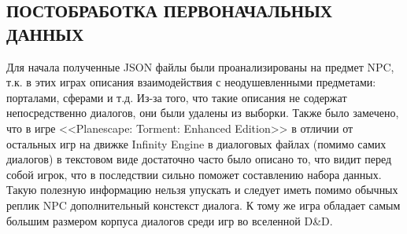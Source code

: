 \subsection{ПОСТОБРАБОТКА ПЕРВОНАЧАЛЬНЫХ ДАННЫХ}

Для начала полученные JSON файлы были проанализированы на предмет NPC, т.к. в этих играх описания взаимодействия с неодушевленными предметами: порталами, сферами и т.д. Из-за того, что такие описания не содержат непосредственно диалогов, они были удалены из выборки. Также было замечено, что в игре <<Planescape: Torment: Enhanced Edition>> в отличии от остальных игр на движке Infinity Engine в диалоговых файлах (помимо самих диалогов) в текстовом виде достаточно часто было описано то, что видит перед собой игрок, что в последствии сильно поможет составлению набора данных. Такую полезную информацию нельзя упускать и следует иметь помимо обычных реплик NPC дополнительный констекст диалога. К тому же игра обладает самым большим размером корпуса диалогов среди игр во вселенной D\&D.